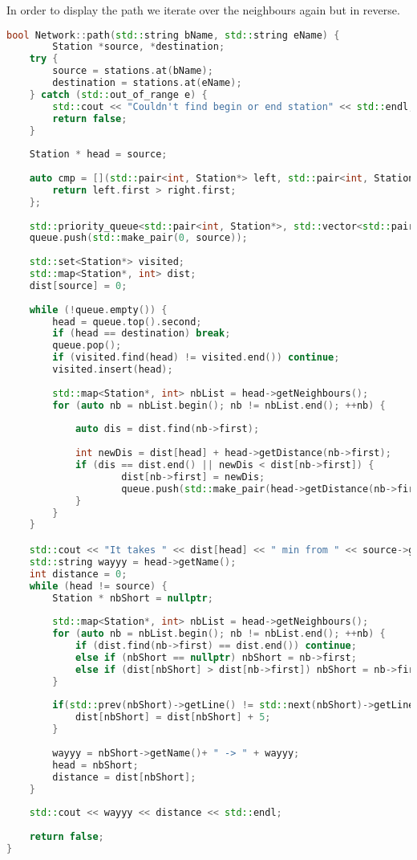 \documentclass[12pt]{article}
\begin{document}
In order to display the path we iterate over the neighbours again but in reverse.  
\\
\begin{lstlisting}[language=C++, caption = Dijkstra's algorithm implemented in path()]
bool Network::path(std::string bName, std::string eName) {
        Station *source, *destination;
    try {
        source = stations.at(bName);
        destination = stations.at(eName);
    } catch (std::out_of_range e) {
        std::cout << "Couldn't find begin or end station" << std::endl;
        return false;
    }
    
    Station * head = source;
    
    auto cmp = [](std::pair<int, Station*> left, std::pair<int, Station*> right) {
        return left.first > right.first;
    };
    
    std::priority_queue<std::pair<int, Station*>, std::vector<std::pair<int, Station*>>,decltype(cmp)> queue(cmp);
    queue.push(std::make_pair(0, source));
    
    std::set<Station*> visited;
    std::map<Station*, int> dist;
    dist[source] = 0;
    
    while (!queue.empty()) {
        head = queue.top().second;
        if (head == destination) break;
        queue.pop();
        if (visited.find(head) != visited.end()) continue;
        visited.insert(head);
        
        std::map<Station*, int> nbList = head->getNeighbours();
        for (auto nb = nbList.begin(); nb != nbList.end(); ++nb) {
            
            auto dis = dist.find(nb->first);
            
            int newDis = dist[head] + head->getDistance(nb->first);
            if (dis == dist.end() || newDis < dist[nb->first]) {
                    dist[nb->first] = newDis;
                    queue.push(std::make_pair(head->getDistance(nb->first), nb->first));
            }
        }
    }

    std::cout << "It takes " << dist[head] << " min from " << source->getName() << " to " << destination->getName() << std::endl;
    std::string wayyy = head->getName();
    int distance = 0;
    while (head != source) {
        Station * nbShort = nullptr;
        
        std::map<Station*, int> nbList = head->getNeighbours();
        for (auto nb = nbList.begin(); nb != nbList.end(); ++nb) {
            if (dist.find(nb->first) == dist.end()) continue;
            else if (nbShort == nullptr) nbShort = nb->first;
            else if (dist[nbShort] > dist[nb->first]) nbShort = nb->first;
        }
        
        if(std::prev(nbShort)->getLine() != std::next(nbShort)->getLine()){
            dist[nbShort] = dist[nbShort] + 5;
        }
        
        wayyy = nbShort->getName()+ " -> " + wayyy;
        head = nbShort;
        distance = dist[nbShort];
    }
    
    std::cout << wayyy << distance << std::endl;
    
    return false;
}
\end{lstlisting} 
\end{document}
